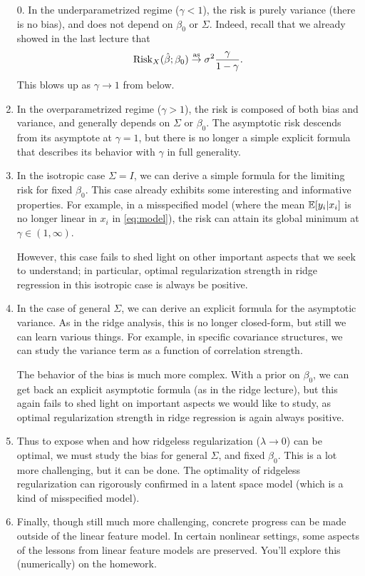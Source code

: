 \documentclass{article}
\begin{document}
\begin{enumerate}
\item[0.]
In the underparametrized regime ($\gamma < 1$), the risk is purely variance
(there is no bias), and does not depend on $\beta_0$ or $\Sigma$. Indeed, recall
that we already showed in the last lecture that
\begin{equation}
\label{eq:ls_risk_limit}
\mathrm{Risk}_X(\hat{\beta}; \beta_0) \overset{\mathrm{as}}{\to} \sigma^2 \frac{\gamma}{1-\gamma}.
\end{equation}
This blows up as $\gamma \to 1$ from below. 

\item
In the overparametrized regime ($\gamma > 1$), the risk is composed of both
bias and variance, and generally depends on $\Sigma$ or $\beta_0$. The
asymptotic risk descends from its asymptote at $\gamma = 1$, but there is no
longer a simple explicit formula that describes its behavior with $\gamma$ in
full generality.

\item
In the isotropic case $\Sigma = I$, we can derive a simple formula for the
limiting risk for fixed $\beta_0$. This case already exhibits some interesting
and informative properties. For example, in a misspecified model (where the mean
$\mathbb{E}[y_i|x_i]$ is no longer linear in $x_i$ in \eqref{eq:model}), the risk can
attain its global minimum at $\gamma \in (1,\infty)$. 

However, this case fails to shed light on other important aspects that we seek
to understand; in particular, optimal regularization strength in ridge
regression in this isotropic case is always be positive.

\item
In the case of general $\Sigma$, we can derive an explicit formula for the
asymptotic variance. As in the ridge analysis, this is no longer closed-form,
but still we can learn various things. For example, in specific covariance
structures, we can study the variance term as a function of correlation
strength.    

The behavior of the bias is much more complex. With a prior on $\beta_0$, we can 
get back an explicit asymptotic formula (as in the ridge lecture), but this
again fails to shed light on important aspects we would like to study, as
optimal regularization strength in ridge regression is again always positive.     

\item
Thus to expose when and how ridgeless regularization ($\lambda \to 0$) can be
optimal, we must study the bias for general $\Sigma$, and fixed $\beta_0$. This
is a lot more challenging, but it can be done. The optimality of ridgeless 
regularization can rigorously confirmed in a latent space model (which is a kind
of misspecified model). 

\item
Finally, though still much more challenging, concrete progress can be made
outside of the linear feature model. In certain nonlinear settings, some aspects
of the lessons from linear feature models are preserved. You'll explore this 
(numerically) on the homework.  
\end{enumerate}
\end{document}
